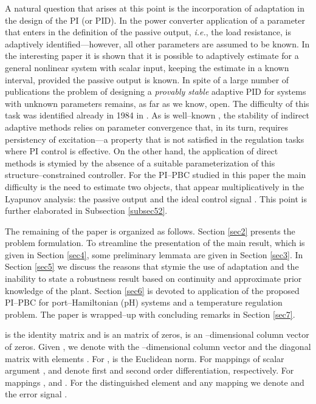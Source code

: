 \documentclass[10pt, conference]{ieeeconf}
\begin{document}
A natural question that arises at this point is the incorporation of adaptation in the design of the PI (or PID). In the  power converter application of \cite{HERetal} a parameter that enters in the definition of the passive output, {\em i.e.}, the load resistance, is adaptively identified---however, all other parameters are assumed to be known. In the interesting paper \cite{ANTAST} it is shown that it is possible to adaptively estimate  for a general nonlinear system with scalar input, keeping the estimate in a known interval, provided the passive output is known. In spite of a large number of publications the problem of designing a {\em provably stable} adaptive PID for systems with unknown parameters remains, as far as we know, open. The difficulty of this task was identified already in 1984 in \cite{ORTKEL}. As is well--known  \cite{SASBOD}, the stability of indirect adaptive methods relies on parameter convergence that, in its turn, requires persistency of excitation---a property that is not satisfied in the regulation tasks where PI control is effective. On the other hand, the application of direct methods is stymied by the absence of a suitable parameterization of this structure--constrained controller. For the PI--PBC studied in this paper the main difficulty is the need to estimate two objects, that appear multiplicatively in the Lyapunov analysis: the passive output and the ideal control signal  . This point is further elaborated in Subsection \ref{subsec52}.

The remaining of the paper is organized as follows. Section \ref{sec2} presents the problem formulation. To streamline the presentation of the main result, which is given in  Section \ref{sec4}, some preliminary lemmata are given in Section \ref{sec3}. In Section \ref{sec5} we discuss the reasons that stymie the use of adaptation and the inability to state a robustness result based on continuity and approximate prior knowledge of the plant. Section \ref{sec6} is devoted to application of the proposed PI--PBC for port--Hamiltonian (pH) systems \cite{VAN}  and a temperature regulation problem. The paper is wrapped--up with concluding remarks in  Section \ref{sec7}.
\vspace{2mm}

  is the  identity matrix and  is an
 matrix of zeros,  is an --dimensional column vector of zeros. Given , we denote with  the --dimensional column vector and  the diagonal  matrix with
elements . For ,   is the Euclidean norm. For mappings of scalar argument ,  and  denote first and second order differentiation, respectively. For mappings ,  and . For the distinguished element  and any mapping  we denote  and the error signal  . 
\end{document}
